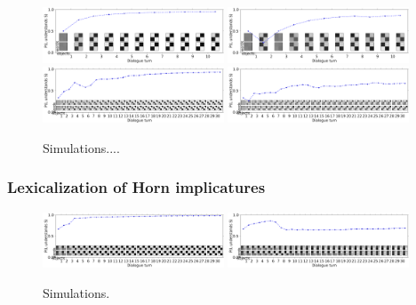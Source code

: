 \documentclass{article} %
\begin{document}
\begin{figure}
\centering
\includegraphics[width=0.48\textwidth]{figures/emergence2x2-1.pdf}
\includegraphics[width=0.48\textwidth]{figures/emergence2x2-3.pdf} \\
\includegraphics[width=0.48\textwidth]{figures/emergence3x3-0.pdf}
\includegraphics[width=0.48\textwidth]{figures/emergence3x3-1.pdf} \\
\caption{\label{fig:emergence} Simulations....}
\end{figure}

\subsubsection{Lexicalization of Horn implicatures}

\begin{figure}
\centering
\includegraphics[width=0.48\textwidth]{figures/horn-emergence-0.pdf}
\includegraphics[width=0.48\textwidth]{figures/horn-emergence-1.pdf}
\caption{\label{fig:horn} Simulations.}
\end{figure}
\end{document}
